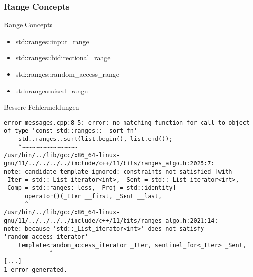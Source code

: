 \subsubsection{Range Concepts}

\begin{frame}[fragile]{Range Concepts}
    \begin{itemize}
        \item<1-> std::ranges::input\_range
        \item<3-> std::ranges::bidirectional\_range
        \item<4-> std::ranges::random\_access\_range
        \item<5-> std::ranges::sized\_range
    \end{itemize}
\end{frame}

\begin{frame}[fragile]{Bessere Fehlermeldungen}
    \begin{verbatim}
error_messages.cpp:8:5: error: no matching function for call to object of type 'const std::ranges::__sort_fn'
    std::ranges::sort(list.begin(), list.end());
    ^~~~~~~~~~~~~~~~~
/usr/bin/../lib/gcc/x86_64-linux-gnu/11/../../../../include/c++/11/bits/ranges_algo.h:2025:7:
note: candidate template ignored: constraints not satisfied [with _Iter = std::_List_iterator<int>, _Sent = std::_List_iterator<int>, _Comp = std::ranges::less, _Proj = std::identity]
      operator()(_Iter __first, _Sent __last,
      ^
/usr/bin/../lib/gcc/x86_64-linux-gnu/11/../../../../include/c++/11/bits/ranges_algo.h:2021:14:
note: because 'std::_List_iterator<int>' does not satisfy 'random_access_iterator'
    template<random_access_iterator _Iter, sentinel_for<_Iter> _Sent,
             ^
[...]
1 error generated.

\end{verbatim}
\end{frame}